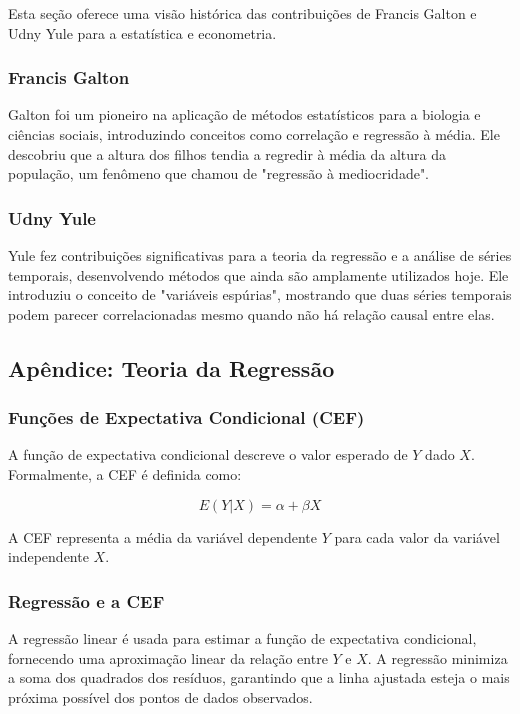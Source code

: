 \documentclass[a4paper,12pt]{article}[abntex2]
\begin{document}
Esta seção oferece uma visão histórica das contribuições de Francis Galton e Udny Yule para a estatística e econometria.

\subsubsection*{Francis Galton}

Galton foi um pioneiro na aplicação de métodos estatísticos para a biologia e ciências sociais, introduzindo conceitos como correlação e regressão à média. Ele descobriu que a altura dos filhos tendia a regredir à média da altura da população, um fenômeno que chamou de "regressão à mediocridade".

\subsubsection*{Udny Yule}

Yule fez contribuições significativas para a teoria da regressão e a análise de séries temporais, desenvolvendo métodos que ainda são amplamente utilizados hoje. Ele introduziu o conceito de "variáveis espúrias", mostrando que duas séries temporais podem parecer correlacionadas mesmo quando não há relação causal entre elas.

\subsection*{Apêndice: Teoria da Regressão}

\subsubsection*{Funções de Expectativa Condicional (CEF)}

A função de expectativa condicional descreve o valor esperado de \(Y\) dado \(X\). Formalmente, a CEF é definida como:

\begin{equation}
    E(Y|X) = \alpha + \beta X
\end{equation}

A CEF representa a média da variável dependente \(Y\) para cada valor da variável independente \(X\).

\subsubsection*{Regressão e a CEF}

A regressão linear é usada para estimar a função de expectativa condicional, fornecendo uma aproximação linear da relação entre \(Y\) e \(X\). A regressão minimiza a soma dos quadrados dos resíduos, garantindo que a linha ajustada esteja o mais próxima possível dos pontos de dados observados.
\end{document}

